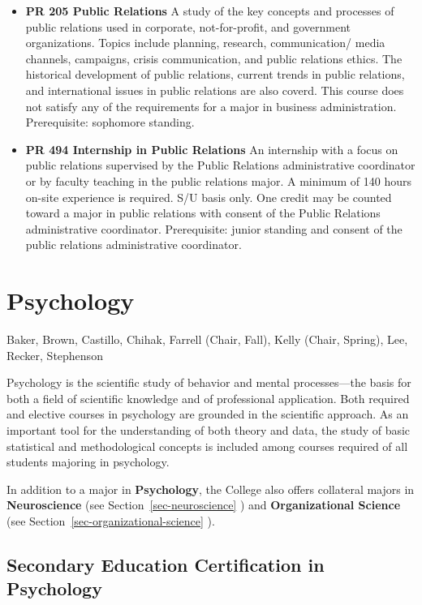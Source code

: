 \documentclass[
  letterpaper,
]{scrbook}
\providecommand{\tightlist}{%
  \setlength{\itemsep}{0pt}\setlength{\parskip}{0pt}}
\begin{document}
\begin{itemize}
\tightlist
\item
  \textbf{PR 205 Public Relations} A study of the key concepts and
  processes of public relations used in corporate, not-for-profit, and
  government organizations. Topics include planning, research,
  communication/ media channels, campaigns, crisis communication, and
  public relations ethics. The historical development of public
  relations, current trends in public relations, and international
  issues in public relations are also coverd. This course does not
  satisfy any of the requirements for a major in business
  administration. Prerequisite: sophomore standing.\\
\item
  \textbf{PR 494 Internship in Public Relations} An internship with a
  focus on public relations supervised by the Public Relations
  administrative coordinator or by faculty teaching in the public
  relations major. A minimum of 140 hours on-site experience is
  required. S/U basis only. One credit may be counted toward a major in
  public relations with consent of the Public Relations administrative
  coordinator. Prerequisite: junior standing and consent of the public
  relations administrative coordinator.
\end{itemize}

\section{Psychology}\label{sec-psychology}

Baker, Brown, Castillo, Chihak, Farrell (Chair, Fall), Kelly (Chair,
Spring), Lee, Recker, Stephenson

Psychology is the scientific study of behavior and mental
processes---the basis for both a field of scientific knowledge and of
professional application. Both required and elective courses in
psychology are grounded in the scientific approach. As an important tool
for the understanding of both theory and data, the study of basic
statistical and methodological concepts is included among courses
required of all students majoring in psychology.

In addition to a major in \textbf{Psychology}, the College also offers
collateral majors in \textbf{Neuroscience} (see
Section~\ref{sec-neuroscience} ) and \textbf{Organizational Science}
(see Section~\ref{sec-organizational-science} ).

\subsection{Secondary Education Certification in
Psychology}\label{secondary-education-certification-in-psychology}
\end{document}
